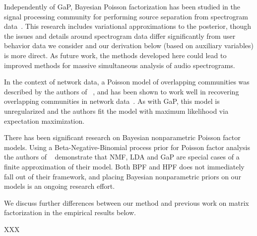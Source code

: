 Independently of GaP, Bayesian Poisson factorization has been studied
in the signal processing community for performing source separation
from spectrogram data~\cite{Cemgil:2009,Hoffman:2012}.  This research
includes variational approximations to the posterior, though the
issues and details around spectrogram data differ significantly from
user behavior data we consider and our derivation below (based on
auxiliary variables) is more direct.  As future work, the methods
developed here could lead to improved methods for massive simultaneous
analysis of audio spectrograms. 

In the context of network data, a Poisson model of overlapping
communities was described by the authors of ~\cite{Ball:2011}, and has
been shown to work well in recovering overlapping communities in
network data~\cite{Gopalan:2013}.  As with GaP, this model is
unregularized and the authors fit the model with maximum likelihood
via expectation maximization.

There has been significant research on Bayesian nonparametric Poisson
factor models. Using a Beta-Negative-Binomial process prior for
Poisson factor analysis the authors of ~\cite{Zhou:2012} demonstrate
that NMF, LDA and GaP are special cases of a finite approximation of
their model. Both BPF and HPF does not immediately fall out of their
framework, and placing Bayesian nonparametric priors on our models is
an ongoing research effort.

We discuss further differences between our method and previous work on
matrix factorization in the empirical results below.

XXX \cite{Marlin:2009,Marlin:2012,Elkan:2008,Ma:2011}
